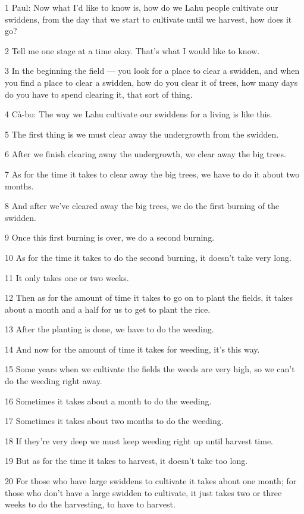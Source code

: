 
1 Paul: Now what I'd like to know is, how do we Lahu people cultivate our swiddens,
from the day that we start to cultivate until we harvest, how does it go?

2 Tell me one stage at a time okay. That's what I would like to know.

3 In the beginning the field --- you look for a place to clear a swidden, and when
you find a place to clear a swidden, how do you clear it of trees, how many days
do you have to spend clearing it, that sort of thing.

4 Cà-bo: The way we Lahu cultivate our swiddens for a living is like this.

5 The first thing is we must clear away the undergrowth from the swidden.

6 After we finish clearing away the undergrowth, we clear away the big trees.

7 As for the time it takes to clear away the big trees, we have to do it about
two months.

8 And after we've cleared away the big trees, we do the first burning of the swidden.

9 Once this first burning is over, we do a second burning.

10 As for the time it takes to do the second burning, it doesn't take very long.

11 It only takes one or two weeks.

12 Then as for the amount of time it takes to go on to plant the fields, it takes
about a month and a half for us to get to plant the rice.

13 After the planting is done, we have to do the weeding.

14 And now for the amount of time it takes for weeding, it's this way.

15 Some years when we cultivate the fields the weeds are very high, so we can't
do the weeding right away.

16 Sometimes it takes about a month to do the weeding.

17 Sometimes it takes about two months to do the weeding.

18 If they're very deep we must keep weeding right up until harvest time.

19 But as for the time it takes to harvest, it doesn't take too long.

20 For those who have large swiddens to cultivate it takes about one month; for
those who don't have a large swidden to cultivate, it just takes two or three weeks
to do the harvesting, to have to harvest.

